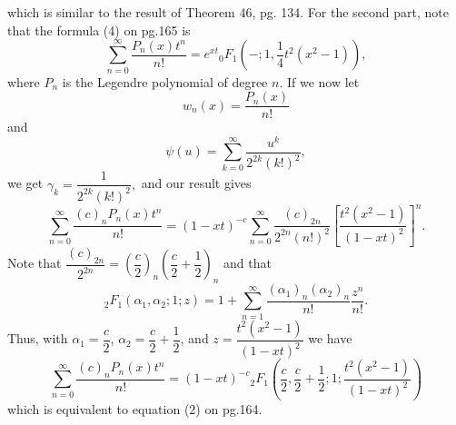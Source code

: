 \begin{solution}
which is similar to the result of Theorem 46, pg. 134. For the second part, note that the formula (4) on pg.165 is
$$\displaystyle\sum_{n=0}^{\infty} \dfrac{P_n(x)t^n}{n!} = e^{xt} {}_0F_1 \left(-;1,\frac{1}{4}t^2(x^2-1) \right),$$
where $P_n$ is the Legendre polynomial of degree $n$. If we now let
$$w_n(x) = \dfrac{P_n(x)}{n!}$$
and
$$\psi(u) = \displaystyle\sum_{k=0}^{\infty} \dfrac{u^k}{2^{2k}(k!)^2},$$
we get $\gamma_k = \dfrac{1}{2^{2k}(k!)^2},$ and our result gives
$$\displaystyle\sum_{n=0}^{\infty} \dfrac{(c)_nP_n(x)t^n}{n!} = (1-xt)^{-c} \displaystyle\sum_{n=0}^{\infty} \dfrac{(c)_{2n}}{2^{2n}(n!)^2} \left[ \dfrac{t^2(x^2-1)}{(1-xt)^2} \right]^n.$$
Note that $\dfrac{(c)_{2n}}{2^{2n}} = \left( \dfrac{c}{2} \right)_n \left( \dfrac{c}{2} + \dfrac{1}{2} \right)_n$ and that
$${}_2F_1 \left( \alpha_1,\alpha_2 ; 1 ; z \right) = 1  + \displaystyle\sum_{n=1}^{\infty} \dfrac{(\alpha_1)_n (\alpha_2)_n}{n!} \dfrac{z^n}{n!}.$$
Thus, with $\alpha_1=\dfrac{c}{2}$, $\alpha_2 = \dfrac{c}{2}+\dfrac{1}{2}$, and $z=\dfrac{t^2(x^2-1)}{(1-xt)^2}$ we have
$$\displaystyle\sum_{n=0}^{\infty} \dfrac{(c)_n P_n(x) t^n}{n!} = (1-xt)^{-c} {}_2F_1 \left( \dfrac{c}{2}, \dfrac{c}{2}+\dfrac{1}{2}; 1 ; \dfrac{t^2(x^2-1)}{(1-xt)^2} \right)$$
which is equivalent to equation (2) on pg.164.

\end{solution}